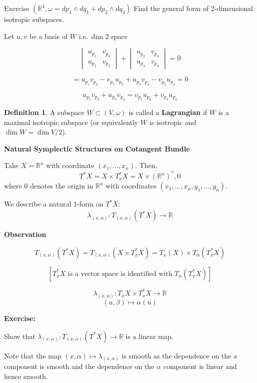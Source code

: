 \documentclass[11pt]{article}
\theoremstyle{definition}
\newtheorem{definition}{Definition}[section]
\theoremstyle{remark}
\begin{document}
Exercise \((\mathbb{R}^4, \omega = dp_1 \wedge dq_1 + dp_2 \wedge dq_2)\)
Find the general form of 2-dimensional isotropic subspaces.

Let \(u, v\) be a basis of \(W\) i.e.\ dim 2 space

\[
\begin{vmatrix}
u_{p_1} & v_{p_1} \\
u_{p_2} & v_{p_2}
\end{vmatrix}
+
\begin{vmatrix}
u_{p_3} & v_{p_3} \\
u_{p_4} & v_{p_4}
\end{vmatrix}
= 0
\]

\[
= u_{p_1}v_{p_2} - v_{p_1}u_{p_2} + u_{p_3}v_{p_4} - v_{p_3}u_{p_4} = 0
\]

\[
u_{p_1}v_{p_2} + u_{p_3}v_{p_4} = v_{p_1}u_{p_2} + v_{p_3}u_{p_4}
\]

\begin{definition}\label{def:lagrangian}
A subspace \(W \subset (V, \omega)\) is called a \textbf{Lagrangian} if \(W\) is a maximal isotropic subspace (or equivalently \(W\) is isotropic and \(\dim W = \dim V/2\)).
\end{definition}

\textbf{Natural Symplectic Structures on Cotangent Bundle}

Take $X = \mathbb{R}^n$ with coordinate $(x_1, \dots, x_n)$. Then,
\[ T^*X = X \times T^*_x X = X \times (\mathbb{R}^n)^*, 0 \]
where $0$ denotes the origin in $\mathbb{R}^n$ with coordinates $(x_1, \dots, x_n, y_1, \dots, y_n)$.

We describe a natural $1$-form on $T^*X$:
\[
\lambda_{(x,\alpha)} \colon T_{(x,\alpha)}(T^*X) \to \mathbb{R}
\]

\textbf{Observation}

\[
T_{(x,\alpha)}(T^*X) = T_{(x,\alpha)}(X \times T^*_x X) = T_x(X) \times T_\alpha(T^*_x X)
\]

\[
[T^*_x X \text{ is a vector space is identified with } T_\alpha(T^*_x X)]
\]

\[
\lambda_{(x,\alpha)} \colon T_x X \times T^*_x X \to \mathbb{R}
\]
\[
(u, \beta) \mapsto \alpha(u)
\]

\textbf{Exercise:}

Show that $\lambda_{(x,\alpha)} \colon T_{(x,\alpha)}(T^*X) \to \mathbb{R}$ is a linear map.

Note that the map $(x, \alpha) \mapsto \lambda_{(x, \alpha)}$ is smooth as the dependence on the $x$ component is smooth and the dependence on the $\alpha$ component is linear and hence smooth.
\end{document}
